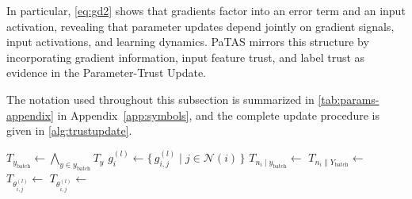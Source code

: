 In particular, \cref{eq:gd2} shows that gradients factor into an error term and an input activation, revealing that parameter updates depend jointly on gradient signals, input activations, and learning dynamics. PaTAS mirrors this structure by incorporating gradient information, input feature trust, and label trust as evidence in the Parameter-Trust Update.

The notation used throughout this subsection is summarized in \cref{tab:params-appendix} in Appendix~\ref{app:symbols}, and the complete update procedure is given in \cref{alg:trustupdate}.

\begin{algorithm}
\caption{Parameter-Trust Update. Revises the trust of each Trust Node parameter by combining gradient evidence, label trust, and neuron input trust under mini-batch training. Helper functions are given in Appendix~\ref{app:algorithm}.}
\begin{algorithmic}[1]
        \State $T_{y_\text{batch}}  \longleftarrow  \bigwedge_{y \in y_\text{batch}} T_y$ 
                \State $g^{(l)}_i  \longleftarrow  \{\, g^{(l)}_{i,j} \;|\; j \in \mathcal{N}(i)\,\}$
                \State $T_{n_i \mid y_\text{batch}}  \longleftarrow $ 
                \State $T_{n_i \parallel Y_\text{batch}}  \longleftarrow $ 
                    \State $T_{\theta_{i,j}^{(l)}}  \longleftarrow $ 
                    \State $T_{\theta_{i,j}^{(l)}} \longleftarrow $ 
                \EndFor
            \EndFor
        \EndFor
    \EndFunction
\end{algorithmic}
\label{alg:trustupdate}
\end{algorithm}
